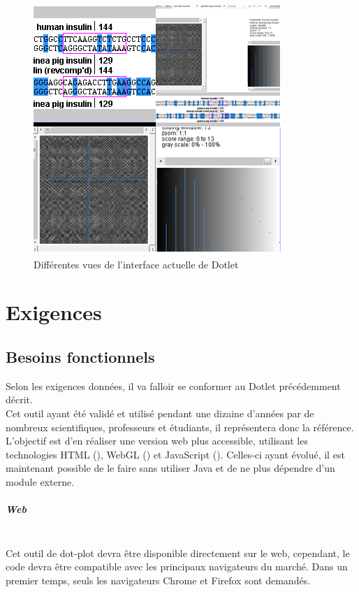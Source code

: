 \documentclass{report}
\begin{document}
\begin{figure}[!ht]
\centerline{\includegraphics[scale=0.75]{dotlet.png}}
\caption{Différentes vues de l'interface actuelle de Dotlet}
\label{dotletInterface}
\end{figure}

\chapter{Exigences}
\section{Besoins fonctionnels}
Selon les exigences données, il va falloir se conformer au Dotlet précédemment décrit.\\
Cet outil ayant été validé et utilisé pendant une dizaine d'années par de nombreux scientifiques, professeurs et étudiants, il représentera donc la référence.\\
L'objectif est d'en réaliser une version web plus accessible, utilisant les technologies HTML (\cite{html5}), WebGL (\cite{khronos}) et JavaScript (\cite{javascript}). Celles-ci ayant évolué, il est maintenant possible de le faire sans utiliser Java et de ne plus dépendre d'un module externe.

\paragraph{Web} ~\\
Cet outil de dot-plot devra être disponible directement sur le web, cependant, le code devra être compatible avec les principaux navigateurs du marché.
Dans un premier temps, seuls les navigateurs Chrome et Firefox sont demandés.
\end{document}
